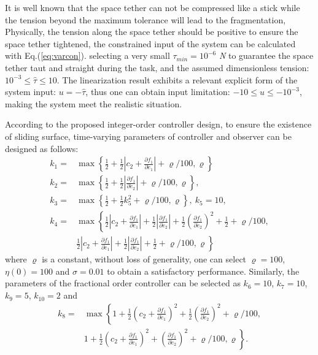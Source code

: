 \documentclass[ShortAfour]{sage}
\theoremstyle{plain}
\theoremstyle{remark}
\begin{document}
It is well known that the space tether can not be compressed like a stick while the tension beyond the maximum tolerance will lead to the fragmentation,
Physically, the tension along the space tether should be positive to ensure the space tether tightened, the constrained input of the system can be calculated with Eq.(\ref{eq:varcon}). selecting a very small $\tau_{min} = 10^{-6}$ \textit{N} to guarantee the space tether taut and straight during the task, and the assumed dimensionless tension: $10^{-3}\le\hat{\tau}\le 10$. The linearization result exhibits a relevant explicit form of the system input: $u = - \hat{\tau}$, thus one can obtain input limitation: $-10\le u\le-10^{-3}$, making the system meet the realistic situation. 

According to the proposed integer-order controller design, to ensure the existence of sliding surface, time-varying parameters of controller and observer can be designed as follows:
\begin{align*}
    k_1=&{\max}\left\{\frac{1}{2}+\frac{1}{2}\left\vert c_2+\frac{\partial f_1}{\partial {\dot e_1}}\right\vert+\varrho/100,\varrho\right\}\\
    k_2=&{\max}\left\{\frac{1}{2}+\frac{1}{2}\left\vert\frac{\partial f_1}{\partial {\dot e_2}}\right\vert+\varrho/100,\varrho\right\},\\
    k_3=&{\max}\left\{\frac{1}{2}+\frac{1}{2}k_5^2+\varrho/100,\varrho\right\},\ k_5=10,\\
    k_4=&{\max}\left\{\frac{1}{2}\left\vert c_2+\frac{\partial f_1}{\partial {\dot e_1}}\right\vert+\frac{1}{2}\left\vert\frac{\partial f_1}{\partial {\dot e_2}}\right\vert+\frac{1}{2}\left(\frac{\partial f_1}{\partial {\dot e_2}}\right)^2+\frac{1}{2}+\varrho/100,\right.\\
    &\left.\frac{1}{2}\left\vert c_2+\frac{\partial f_1}{\partial {\dot e_1}}\right\vert+\frac{1}{2}\left\vert\frac{\partial f_1}{\partial {\dot e_2}}\right\vert+\frac{1}{2}+\varrho/100,\varrho\right\}
\end{align*}
where $\varrho$ is a constant, without loss of generality, one can select $\varrho=100$, $\eta(0)=100$ and $\sigma=0.01$ to obtain a satisfactory performance. Similarly, the parameters of the fractional order controller can be selected as $k_6=10$, $k_7=10$, $k_9=5$, $k_{10}=2$ and
\begin{align*}
    k_8=&{\max}\left\{1+\frac{1}{2}\left(c_2+\frac{\partial f_1}{\partial {\dot e_1}}\right)^2+\frac{1}{2}\left(\frac{\partial f_1}{\partial \dot e_2}\right)^2+\varrho/100,\right.\\
    &\left.1+\frac{1}{2}\left(c_2+\frac{\partial f_1}{\partial {\dot e_1}}\right)^2+\left(\frac{\partial f_1}{\partial \dot e_2}\right)^2+\varrho/100,\varrho\right\}.
\end{align*}
\end{document}
